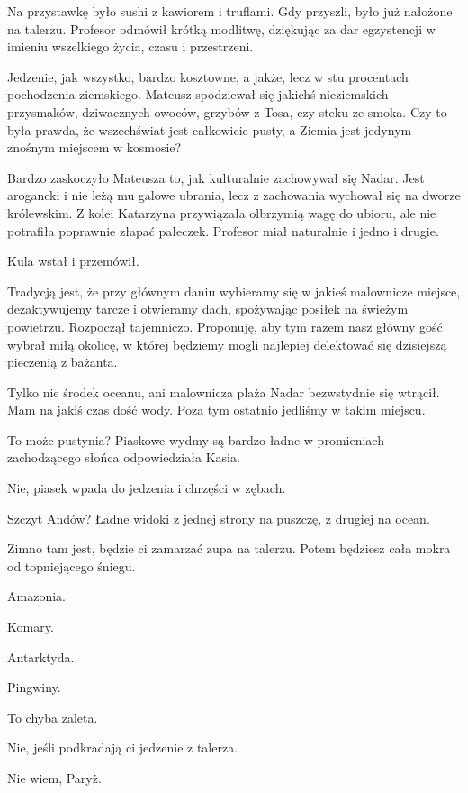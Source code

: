 Na przystawkę było sushi z kawiorem i truflami. Gdy przyszli, było już nałożone na talerzu. 
Profesor odmówił krótką modlitwę, dziękując za dar egzystencji w imieniu wszelkiego życia, czasu i przestrzeni.

Jedzenie, jak wszystko, bardzo kosztowne, a jakże, lecz w stu procentach pochodzenia ziemskiego.
Mateusz spodziewał się jakichś nieziemskich przysmaków, dziwacznych owoców, grzybów z Tosa, czy steku ze smoka.
Czy to była prawda, że wszechświat jest całkowicie pusty, a Ziemia jest jedynym znośnym miejscem w kosmosie?

Bardzo zaskoczyło Mateusza to, jak kulturalnie zachowywał się Nadar. Jest arogancki i nie leżą mu galowe ubrania, lecz z zachowania wychował się na dworze królewskim.
Z kolei Katarzyna przywiązała olbrzymią wagę do ubioru, ale nie potrafiła poprawnie złapać pałeczek.
Profesor miał naturalnie i jedno i drugie.

Kula wstał i przemówił.

\ds{} Tradycją jest, że przy głównym daniu wybieramy się w jakieś malownicze miejsce, dezaktywujemy tarcze i otwieramy dach, spożywając posiłek na świeżym powietrzu. \dm{}
Rozpoczął tajemniczo. \dm{} Proponuję, aby tym razem nasz główny gość wybrał miłą okolicę, w której będziemy mogli najlepiej delektować się dzisiejszą pieczenią z bażanta. \de{}

\ds{} Tylko nie środek oceanu, ani malownicza plaża \dm{} Nadar bezwstydnie się wtrącił. \dm{} Mam na jakiś czas dość wody. 
Poza tym ostatnio jedliśmy w takim miejscu. \de{}

\ds{} To może pustynia? Piaskowe wydmy są bardzo ładne w promieniach zachodzącego słońca \dm{} odpowiedziała Kasia. \de{}

\ds{} Nie, piasek wpada do jedzenia i chrzęści w zębach. \de{}

\ds{} Szczyt Andów? Ładne widoki z jednej strony na puszczę, z drugiej na ocean. \de{}

\ds{} Zimno tam jest, będzie ci zamarzać zupa na talerzu. Potem będziesz cała mokra od topniejącego śniegu. \de{}

\ds{} Amazonia. \de{}

\ds{} Komary. \de{}

\ds{} Antarktyda. \de{}

\ds{} Pingwiny. \de{}

\ds{} To chyba zaleta. \de{}

\ds{} Nie, jeśli podkradają ci jedzenie z talerza. \de{}

\ds{} Nie wiem, Paryż. \de{}

